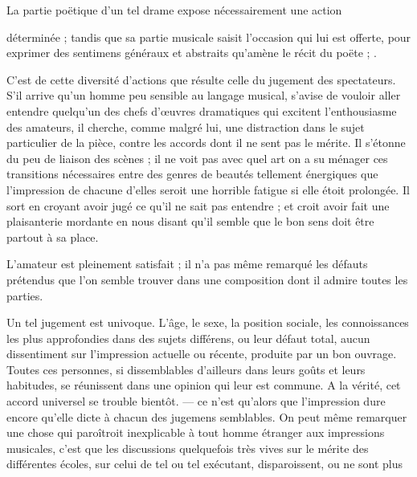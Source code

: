 \documentclass[11pt,a4paper]{article}
\begin{document}
La partie poëtique d'un tel drame expose nécessairement une action


déterminée ; tandis que sa partie musicale  saisit
l'occasion qui lui est offerte, pour exprimer des sentimens généraux et
abstraits qu'amène le récit du poëte ; .

C'est de cette diversité d'actions que résulte celle du jugement des
spectateurs.
S'il arrive qu'un homme peu sensible au langage musical, s'avise de vouloir
aller entendre quelqu'un des chefs d'œuvres dramatiques qui excitent
l'enthousiasme des amateurs,   il cherche,
comme malgré lui, une distraction dans le sujet particulier de la pièce, contre
les accords dont il ne sent pas le mérite. Il s'étonne du peu de liaison des
scènes ; il ne voit pas avec quel art on a su ménager ces transitions
nécessaires entre des genres de beautés tellement énergiques que
 l'impression de chacune d'elles seroit une horrible
fatigue si elle étoit prolongée. Il sort en croyant avoir jugé ce qu'il ne
sait pas entendre ; et croit avoir fait une plaisanterie mordante en nous
disant qu'il semble que le bon sens doit être partout à sa place.


L'amateur est pleinement satisfait ; il n'a pas même remarqué les défauts
prétendus que l'on semble trouver dans une composition dont il admire toutes
les parties.

Un tel jugement est univoque. L'âge, le sexe, la position sociale, les
connoissances les plus approfondies dans des sujets différens, ou leur défaut
total,  aucun dissentiment sur l'impression
 actuelle ou récente, produite par un bon ouvrage. Toutes ces
personnes, si dissemblables d'ailleurs dans leurs goûts et leurs habitudes, se
réunissent dans une opinion qui leur est commune. A la vérité, cet accord
universel se trouble bientôt. — ce n'est qu'alors que l'impression dure encore
qu'elle dicte à chacun des jugemens semblables. On peut même remarquer une
chose qui paroîtroit inexplicable à tout homme étranger aux impressions
musicales, c'est que les discussions quelquefois très vives sur le mérite des
différentes écoles, sur celui de tel ou tel exécutant, disparoissent, ou ne
sont plus
\end{document}
